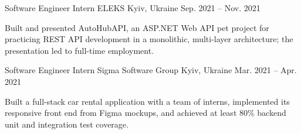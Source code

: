\begin{cventries}
  \cventry
    {Software Engineer Intern} %
    {ELEKS} %
    {Kyiv, Ukraine} %
    {Sep. 2021 – Nov. 2021} %
    {
      \begin{cvitems} %
        \item {Built and presented AutoHubAPI, an ASP.NET Web API pet project for practicing REST API development in a monolithic, multi-layer architecture; the presentation led to full-time employment.}
      \end{cvitems}
    }

  \cventry
    {Software Engineer Intern} %
    {Sigma Software Group} %
    {Kyiv, Ukraine} %
    {Mar. 2021 – Apr. 2021} %
    {
      \begin{cvitems} %
        \item {Built a full-stack car rental application with a team of interns, implemented its responsive front end from Figma mockups, and achieved at least 80\% backend unit and integration test coverage.}
      \end{cvitems}
    }
\end{cventries}
